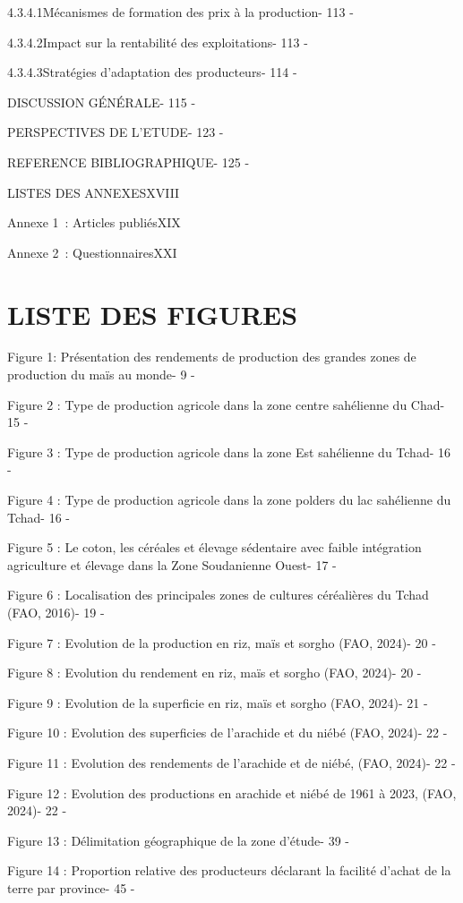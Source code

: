 \documentclass[12pt,oneside]{report}
\begin{document}
4.3.4.1Mécanismes de formation des prix à la production- 113 -

4.3.4.2Impact sur la rentabilité des exploitations- 113 -

4.3.4.3Stratégies d'adaptation des producteurs- 114 -

DISCUSSION GÉNÉRALE- 115 -

PERSPECTIVES DE L’ETUDE- 123 -

REFERENCE BIBLIOGRAPHIQUE- 125 -

LISTES DES ANNEXESXVIII

Annexe 1 : Articles publiésXIX

Annexe 2 : QuestionnairesXXI

\chapter{LISTE DES FIGURES}
Figure 1: Présentation des rendements de production des grandes zones de production du maïs au monde- 9 -

Figure 2 : Type de production agricole dans la zone centre sahélienne du Chad- 15 -

Figure 3 : Type de production agricole dans la zone Est sahélienne du Tchad- 16 -

Figure 4 : Type de production agricole dans la zone polders du lac sahélienne du Tchad- 16 -

Figure 5 : Le coton, les céréales et élevage sédentaire avec faible intégration agriculture et élevage dans la Zone Soudanienne Ouest- 17 -

Figure 6 : Localisation des principales zones de cultures céréalières du Tchad (FAO, 2016)- 19 -

Figure 7 : Evolution de la production en riz, maïs et sorgho (FAO, 2024)- 20 -

Figure 8 : Evolution du rendement en riz, maïs et sorgho (FAO, 2024)- 20 -

Figure 9 : Evolution de la superficie en riz, maïs et sorgho (FAO, 2024)- 21 -

Figure 10 : Evolution des superficies de l’arachide et du niébé (FAO, 2024)- 22 -

Figure 11 : Evolution des rendements de l’arachide et de niébé, (FAO, 2024)- 22 -

Figure 12 : Evolution des productions en arachide et niébé de 1961 à 2023, (FAO, 2024)- 22 -

Figure 13 : Délimitation  géographique de la zone d’étude- 39 -

Figure 14 : Proportion relative des producteurs déclarant la facilité d’achat de la terre par province- 45 -
\end{document}
